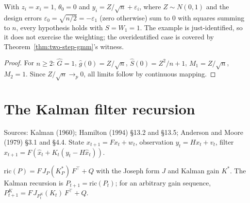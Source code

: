 \begin{theorem}
\label{thm:feasible-gmm-witness}
\leanok
{}
With $z_i = x_i = 1$, $\theta_0 = 0$ and $y_i = Z/\sqrt n + \varepsilon_i$, where $Z\sim N(0,1)$ and the design errors
$\varepsilon_0 = \sqrt{n/2} = -\varepsilon_1$ (zero otherwise) sum to $0$ with squares summing to $n$, every hypothesis
holds with $S = W_1 = 1$. The example is just-identified, so it does not exercise the weighting; the overidentified case
is covered by Theorem~\ref{thm:two-step-gmm}'s witness.
\end{theorem}
\begin{proof}
\leanok
For $n\ge2$: $\hat G = 1$, $\hat g(0) = Z/\sqrt n$, $\hat S(0) = Z^2/n + 1$, $M_1 = Z/\sqrt n$, $M_2 = 1$. Since
$Z/\sqrt n\to_p0$, all limits follow by continuous mapping.
\end{proof}

\section{The Kalman filter recursion}
\label{sec:kalman-recursion}

Sources: Kalman (1960); Hamilton (1994) \S13.2 and \S13.5; Anderson and Moore (1979) \S3.1 and \S4.4. State
$x_{t+1} = Fx_t + w_t$, observation $y_t = Hx_t + v_t$, filter $\hat x_{t+1} = F(\hat x_t + K_t(y_t - H\hat x_t))$.

\begin{definition}
\label{def:riccati}
\leanok
{}
$\mathrm{ric}(P) = F\,J_P(K^*_P)\,F^\top + Q$ with the Joseph form $J$ and Kalman gain $K^*$. The Kalman recursion is
$P_{t+1} = \mathrm{ric}(P_t)$; for an arbitrary gain sequence, $P^K_{t+1} = F\,J_{P^K_t}(K_t)\,F^\top + Q$.
\end{definition}

